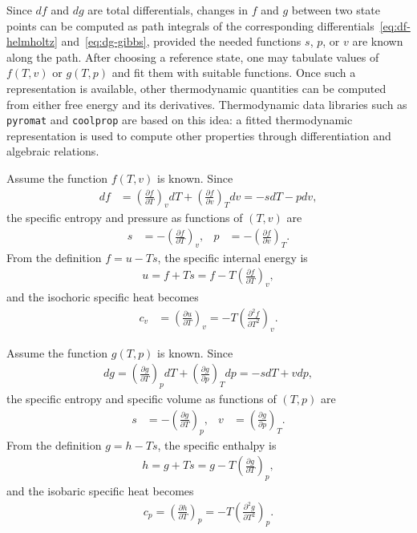 Since $df$ and $dg$ are total differentials, changes in $f$ and $g$ between two
state points can be computed as path integrals of the corresponding differentials~\eqref{eq:df-helmholtz} and~\eqref{eq:dg-gibbs}, provided the needed functions $s$, $p$, or $v$ are known along the path. After choosing a reference state, one may tabulate values of $f(T,v)$ or $g(T,p)$ and fit them with suitable functions. Once such a representation is available, other thermodynamic quantities can be computed from either free energy and its derivatives. Thermodynamic data libraries such as \verb|pyromat| and \verb|coolprop| are based on this idea: a fitted thermodynamic representation is used to compute other properties through differentiation and algebraic relations.
\begin{example}
    Assume the function $f(T,v)$ is known. Since
    \begin{align*}
    df&=\left(\frac{\partial f}{\partial T}\right)_vdT
    +\left(\frac{\partial f}{\partial v}\right)_Tdv
    =-sdT-pdv,
    \end{align*}
    the specific entropy and pressure as functions of $(T,v)$ are
    \begin{align*}
        s&=-\left(\frac{\partial f}{\partial T}\right)_v, &
        p&=-\left(\frac{\partial f}{\partial v}\right)_T.
    \end{align*}
    From the definition $f=u-Ts$, the specific internal energy is
    \begin{align*} 
        u=f+Ts=f-T\left(\frac{\partial f}{\partial T}\right)_v,
    \end{align*}
    and the isochoric specific heat becomes
    \begin{align*}
        c_v&=\left(\frac{\partial u}{\partial T}\right)_v
        =-T\left(\frac{\partial^2f}{\partial T^2}\right)_v.
    \end{align*}
\end{example}
\begin{example}
    Assume the function $g(T,p)$ is known. Since
    \begin{align*}
        dg=\left(\frac{\partial g}{\partial T}\right)_pdT
        +\left(\frac{\partial g}{\partial p}\right)_Tdp
        =-sdT+vdp,
    \end{align*}
    the specific entropy and specific volume as functions of $(T,p)$ are
    \begin{align*}
        s&=-\left(\frac{\partial g}{\partial T}\right)_p, &
        v&=\left(\frac{\partial g}{\partial p}\right)_T.
    \end{align*}
    From the definition $g=h-Ts$, the specific enthalpy is
    \begin{align*}
        h=g+Ts=g-T\left(\frac{\partial g}{\partial T}\right)_p,
    \end{align*}
    and the isobaric specific heat becomes
    \begin{align*}
        c_p=\left(\frac{\partial h}{\partial T}\right)_p
        =-T\left(\frac{\partial^2 g}{\partial T^2}\right)_p.
    \end{align*}
\end{example}

